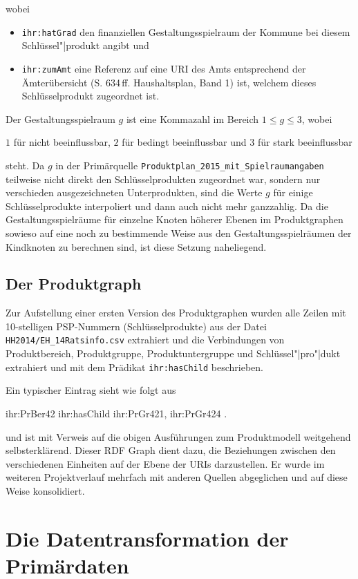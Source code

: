 \documentclass[a4paper,11pt,twoside]{article}
\begin{document}
wobei 
\begin{itemize}
\item \texttt{ihr:hatGrad} den finanziellen Gestaltungsspielraum der Kommune
  bei diesem Schlüssel"|produkt angibt und 
\item \texttt{ihr:zumAmt} eine Referenz auf eine URI des Amts entsprechend der
  Ämterübersicht  (S. 634\,ff. Haushaltsplan, Band 1) ist, welchem dieses
  Schlüsselprodukt zugeordnet ist. 
\end{itemize} 
Der Gestaltungsspielraum $g$ ist eine Kommazahl im Bereich $1\le g\le 3$, wobei
\begin{center}
  $1$ für nicht beeinflussbar, $2$ für bedingt beeinflussbar und $3$ für stark
  beeinflussbar 
\end{center}
steht. Da $g$ in der Primärquelle
\texttt{Produktplan\_2015\_mit\_Spielraumangaben} teilweise nicht direkt den
Schlüsselprodukten zugeordnet war, sondern nur verschieden ausgezeichneten
Unterprodukten, sind die Werte $g$ für einige Schlüsselprodukte interpoliert
und dann auch nicht mehr ganzzahlig.  Da die Gestaltungsspielräume für
einzelne Knoten höherer Ebenen im Produktgraphen sowieso auf eine noch zu
bestimmende Weise aus den Gestaltungsspielräumen der Kindknoten zu berechnen
sind, ist diese Setzung naheliegend.

\subsection{Der Produktgraph}

Zur Aufstellung einer ersten Version des Produktgraphen wurden alle Zeilen mit
10-stelligen PSP-Nummern (Schlüsselprodukte) aus der Datei
\texttt{HH2014/EH\_14Ratsinfo.csv} extrahiert und die Verbindungen von
Produktbereich, Produktgruppe, Produktuntergruppe und Schlüssel"|pro"|dukt
extrahiert und mit dem Prädikat \texttt{ihr:hasChild} beschrieben.

Ein typischer Eintrag sieht wie folgt aus
\begin{code}
  ihr:PrBer42 ihr:hasChild ihr:PrGr421, ihr:PrGr424 .
\end{code}

und ist mit Verweis auf die obigen Ausführungen zum Produktmodell weitgehend
selbsterklärend. Dieser RDF Graph dient dazu, die Beziehungen zwischen den
verschiedenen Einheiten auf der Ebene der URIs darzustellen.  Er wurde im
weiteren Projektverlauf mehrfach mit anderen Quellen abgeglichen und auf diese
Weise konsolidiert. 

\section{Die Datentransformation der Primärdaten}
\end{document}
